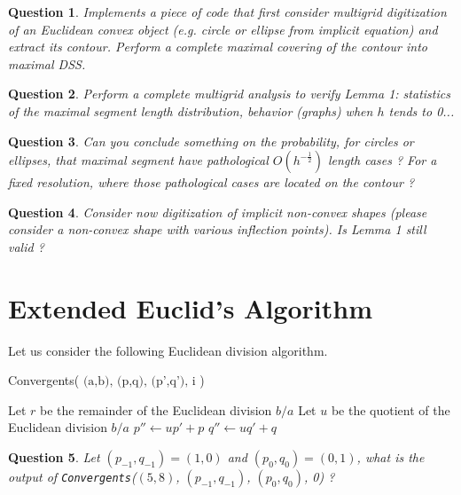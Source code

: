 \documentclass[a4paper, 11pt]{article}
\newtheorem{qu}{Question}
\begin{document}
\begin{qu}
  Implements a piece of code that first consider multigrid
  digitization of an Euclidean convex object (e.g. circle or ellipse
  from implicit equation) and extract its contour. Perform a complete
  maximal covering of the contour into maximal DSS.
\end{qu}


\begin{qu}
  Perform a complete multigrid analysis to verify Lemma 1: statistics
  of the maximal segment length distribution, behavior (graphs) when
  $h$ tends to 0...
\end{qu}


\begin{qu}
  Can you conclude something on the probability, for circles or
  ellipses,  that maximal segment have pathological
  $O(h^{-\frac{1}{2}})$ length cases ? For a fixed resolution, where
  those pathological cases are located on the contour ?
\end{qu}


\begin{qu}
  Consider now digitization of implicit non-convex shapes (please
  consider a non-convex shape with various inflection points). Is
  Lemma 1 still valid ?
\end{qu}



\section{Extended Euclid's Algorithm}

Let us consider the following Euclidean division algorithm.

\begin{procedure}[H]
\caption{Convergents( $\text{(a,b), (p,q), (p',q'), i}$ )}
\label{algo:conv}
%
Let $r$ be the remainder of the Euclidean division $b/a$\;
Let $u$ be the quotient  of the Euclidean division $b/a$\;
$p'' \leftarrow up' + p$\; $q'' \leftarrow uq' + q$\;
\end{procedure}


\begin{qu}
\label{qu:init}
  Let $(p_{-1},q_{-1})=(1,0)$ and $(p_0,q_0)=(0,1)$, what is the
  output of \emph{\texttt{Convergents}}($(5,8)$, $(p_{-1},q_{-1})$,
  $(p_0,q_0)$, 0) ?
\end{qu}
\end{document}
